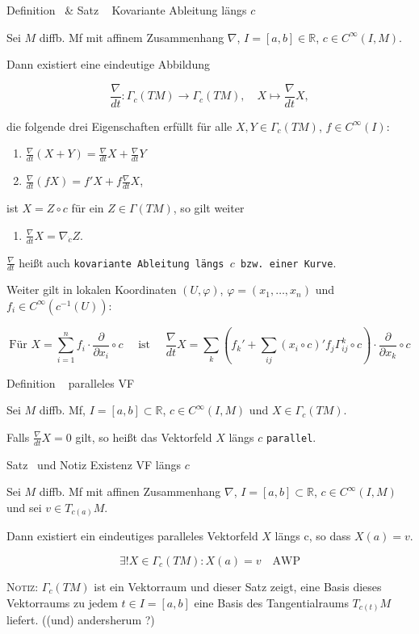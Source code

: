 \documentclass[a6paper,11pt,grid=front]{kartei}
\newcommand{\fl}[1]{\begin{flushleft}
 #1 \end{flushleft}}
\newcommand{\R}{\mathbb{R}}
\newcommand{\pd}[1][x_i]{\frac{\partial}{\partial {#1}}}
\newcommand{\nabladt}[1][t]{\frac{\nabla}{d#1}}
\newcounter{def}
\newcounter{satz}
\newcommand{\defreset}{\setcounter{def}{1}}
\newcommand{\satzreset}{\setcounter{satz}{1}}
\newcommand{\thisdef}{\thedef\ \stepcounter{def}}
\newcommand{\thissatz}{\thesatz\ \stepcounter{satz}}
\begin{document}
\nonameyet
{\scriptsize Definition \thisdef \& Satz \thissatz} 
{\scriptsize Kovariante Ableitung längs $c$}
{
	\scriptsize
	\vspace{-2em}
Sei $M$ diffb. Mf mit affinem Zusammenhang $\nabla$, $I =[a,b] \in \R$, 
$c\in C^\infty(I,M)$.
\fl{Dann existiert eine eindeutige Abbildung}
\[
\nabladt: \Gamma_c(TM) \to \Gamma_c(TM), \quad X \mapsto \nabladt X,
\]
\fl{die folgende drei Eigenschaften erfüllt für alle $X,Y \in \Gamma_c(TM)$,
$f\in C^\infty(I)$:}
\begin{enumerate}[1.]
\item $\nabladt(X+Y) = \nabladt X + \nabladt Y$
\item $\nabladt(fX) = f' X + f \nabladt X$,
\end{enumerate}
\fl{ist $X = Z \circ c$ für ein $Z \in \Gamma(TM)$, so gilt weiter}
\begin{enumerate}[3.]
\item $\nabladt X = \nabla_{\dot c} Z$.
\end{enumerate}
\fl{$\nabladt$ heißt auch \texttt{kovariante Ableitung längs $c$ bzw. einer
Kurve}.}
\fl{Weiter gilt in lokalen Koordinaten $(U,\varphi)$, 
\vspace{-1em}
$\varphi = (x_1,\dots,x_n)$ und $f_i \in C^\infty(c^{-1} (U))$:}
\[
\text{Für } X = \sum_{i=1}^n f_i \cdot \pd[x_i] \circ c 
\quad \text{ ist } \quad 
\nabladt X = \sum_k \left ( f_k' + \sum_{ij} (x_i \circ c)' f_j 
\Gamma^k_{ij} \circ c \right) \cdot \pd[x_k] \circ c
\]
}
{}
\defreset
\satzreset
{}

\nonameyet
{Definition \thisdef} {paralleles VF}
{
Sei $M$ diffb. Mf, $I = [a,b] \subset \R$, $c\in C^\infty(I,M)$ und 
$X \in \Gamma_c(TM)$.
\fl{Falls $\nabladt X = 0 $ gilt, so heißt das Vektorfeld $X$ längs $c$ 
\texttt{parallel}.}
}
{}

\nonameyet
{Satz \thissatz und Notiz} {Existenz VF längs $c$}
{
	\small
Sei $M$ diffb. Mf mit affinen Zusammenhang $\nabla$, 
$I = [a,b] \subset \R$, $c\in C^\infty(I,M)$ und sei $v \in T_{c(a)}M$.
\fl{Dann existiert ein eindeutiges paralleles Vektorfeld $X$ längs c,
so dass $X(a) = v$.}
\[
 \exists ! X \in \Gamma_c(TM): X(a) = v
 \quad \text{AWP}
\]
\fl{\textsc{Notiz:} $\Gamma_c(TM)$ ist ein Vektorraum und dieser Satz zeigt,
eine Basis dieses Vektorraums zu jedem $t\in I = [a,b]$ eine Basis
des Tangentialraums $T_{c(t)}M$ liefert. ((und) andersherum ?)}
}
{}
\end{document}
